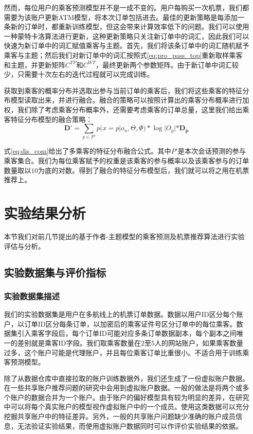 然而，每位用户的乘客预测模型并不是一成不变的。用户每购买一次机票，我们都需要为该账户更新ATM模型，将本次订单包括进去。最佳的更新策略是每添加一条新的订单时，都重新训练模型，但这会带来计算效率低下的问题。我们可以使用一种蒙特卡洛算法进行更新，这种更新策略只关注新订单中的词汇，因此我们可以快速为新订单中的词汇赋值乘客与主题。首先，我们将该条订单中的词汇随机赋予乘客与主题；然后我们对新订单中的词汇按照式\ref{eq:pro_pass_top}重新取样乘客和主题，并更新矩阵$C^{TP}$和$C^{WT}$，最终更新两个参数矩阵。由于新订单中词汇较少，只需要十次左右的迭代过程就可以完成训练。

获取到乘客的概率分布并选取出参与当前订单的乘客后，我们将这些乘客的特征分布模型读取出来，并进行融合。融合的策略可以按照计算出的乘客分布概率进行加权，我们除了考虑乘客分布概率外，还需要考虑乘客的订单总量，这里我们给出乘客特征分布模型的融合策略：
\begin{equation}
	\label{eq:dis_com}
	\mathbf{D'} = \sum_{p \in P'} p(x = p|o_n,\Theta,\Phi) * \log |O_p| * \mathbf{D_p}
\end{equation}

式\ref{eq:dis_com}给出了多乘客的特征分布融合公式。其中$P'$是本次会话预测的参与乘客集合。我们为每位乘客赋予的权重是该乘客的参与概率以及该乘客参与的订单数量取以$10$为底的对数。得到了融合的特征分布模型后，我们就可以将之用在机票推荐上。

\section{实验结果分析}

本节我们对前几节提出的基于作者-主题模型的乘客预测及机票推荐算法进行实验评估与分析。

\subsection{实验数据集与评价指标}

\subsubsection{实验数据集描述}
我们的实验数据集是用户在多航线上的机票订单数据。数据以用户ID区分每个账户，以订单ID区分每条订单，以加密后的乘客证件号区分订单中的每位乘客。数据集引入乘客字段后，每个订单ID可能对应多条订单数据副本，每个副本之间唯一的差别就是乘客ID字段。我们取乘客数量在$2$至$5$人的网站账户，如果乘客数量过多，这个账户可能是代理账户，并且每位乘客订单比重很小。不适合用于训练乘客预测模型。

除了从数据仓库中直接拉取的账户训练数据外，我们还生成了一份虚拟账户数据。在一些共享账户推荐问题的研究中会用到虚拟账户数据。一般的做法是将两个或多个账户的数据合并为一个账户。由于账户的偏好模型具有较为明显的差异，在研究中可以将每个真实账户的模型视作虚拟账户中的一个成员。使用这类数据可以充分挖掘共享账户中的特征差异。另外，一般的共享账户问题缺少准确的账户成员信息，无法验证实验结果，而使用虚拟账户数据同时可以作评价实验结果的依据。

